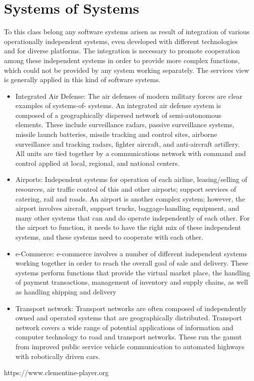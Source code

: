 \chapter{Systems of Systems}\label{ch:SoS}
To this class belong any software systems arisen as result of integration of various operationally independent systems, even developed with different technologies and for diverse platforms. The integration is necessary to promote cooperation among these independent systems in order to provide more complex functions, which could not be provided by any system working separately. The services view is generally applied in this kind of software systems.
\begin{itemize}                                           	
\item Integrated Air Defense: The air defenses of modern military forces are
clear examples of systems-of- systems. An integrated air defense system is composed of a geographically dispersed network of semi-autonomous elements. These include surveillance radars, passive surveillance systems, missile launch batteries, missile tracking and control sites, airborne surveillance and tracking radars, fighter aircraft, and anti-aircraft artillery. All units are tied together by a communications network with command and control applied at local, regional, and national centers.
 
\item Airports: Independent systems for operation of each airline,
leasing/selling of resources, air traffic control of this and other airports; support services of catering, rail and roads. An airport is another complex system; however, the airport involves aircraft, support trucks, baggage-handling equipment, and many other systems that can and do operate independently of each other. For the airport to function, it needs to have the right mix of these independent systems, and these systems need to cooperate with each other.
 
\item e-Commerce: e-commerce involves a number of different independent systems
working together in order to reach the overall goal of sale and delivery. These systems perform functions that provide the virtual market place, the handling of payment transactions, management of inventory and supply chains, as well as handling shipping and delivery
                                            	
\item Transport network: Transport networks are often composed of independently
owned and operated systems that are geographically distributed.  Transport network covers a wide range of potential applications of information and computer technology to road and transport networks. These run the gamut from improved public service vehicle communication to automated highways with robotically driven cars.
\end{itemize}


https://www.clementine-player.org

